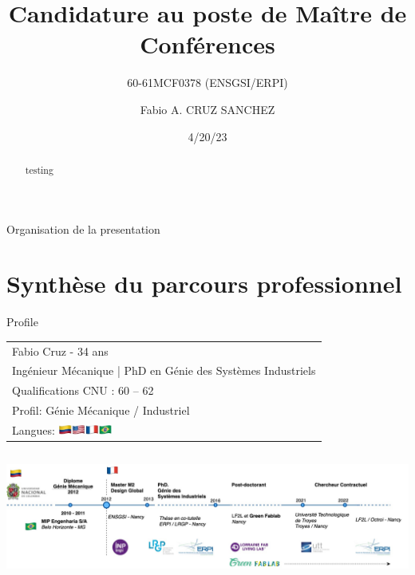 \documentclass[
  11pt,
  ignorenonframetext,
  aspectratio=169,
  c]{beamer}
\title{Candidature au poste de Maître de Conférences}
\subtitle{60-61MCF0378 (ENSGSI/ERPI)}
\author{Fabio A. CRUZ SANCHEZ}
\date{4/20/23}
\institute{Section CNU 60}
\begin{document}
\frame{\titlepage}
\begin{abstract}
testing
\end{abstract}
\ifdefined\Shaded\renewenvironment{Shaded}{\begin{tcolorbox}[frame hidden, borderline west={3pt}{0pt}{shadecolor}, enhanced, breakable, boxrule=0pt, interior hidden, sharp corners]}{\end{tcolorbox}}\fi

\begin{frame}[plain]{Organisation de la presentation}
\protect\hypertarget{organisation-de-la-presentation}{}
\tableofcontents[hideallsubsections]

\end{frame}

\hypertarget{synthuxe8se-du-parcours-professionnel}{%
\section{Synthèse du parcours
professionnel}\label{synthuxe8se-du-parcours-professionnel}}

\begin{frame}[t]{Profile}
\protect\hypertarget{profile}{}
\extrarowsep=-1.5pt
\begin{tabu} to 
Fabio Cruz - 34 ans  \\
Ingénieur Mécanique | PhD en Génie des Systèmes Industriels \\
Qualifications CNU : 60 – 62 \\
Profil:  Génie Mécanique / Industriel\\
Langues: \includegraphics[width=50pt]{Figures/slides/Langues.jpg}


\end{tabu}

\begin{columns}[T]
\begin{column}[c]{1\textwidth}
\includegraphics{Figures/slides/Fabio-timeline-Parcours.jpg}
\end{column}
\end{columns}

\note{}
\end{frame}
\end{document}
